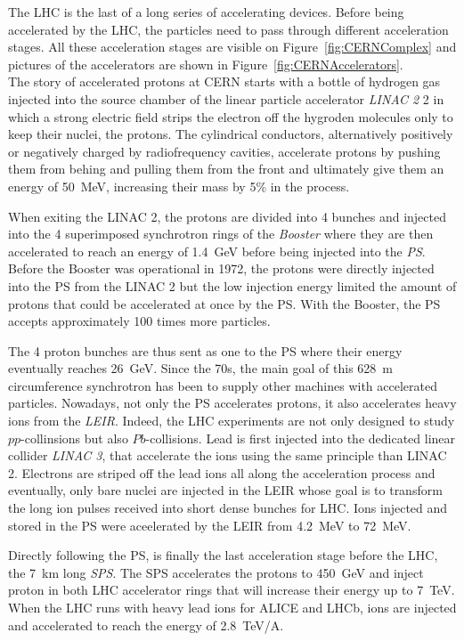 	The LHC is the last of a long series of accelerating devices. Before being accelerated by the LHC, the particles need to pass through different acceleration stages. All these acceleration stages are visible on Figure~\ref{fig:CERNComplex} and pictures of the accelerators are shown in Figure~\ref{fig:CERNAccelerators}.\\
	
	The story of accelerated protons at CERN starts with a bottle of hydrogen gas injected into the source chamber of the linear particle accelerator \textit{LINAC 2} 2 in which a strong electric field strips the electron off the hygroden molecules only to keep their nuclei, the protons. The cylindrical conductors, alternatively positively or negatively charged by radiofrequency cavities, accelerate protons by pushing them from behing and pulling them from the front and ultimately give them an energy of \SI{50}{MeV}, increasing their mass by 5\% in the process.
	
	When exiting the LINAC 2, the protons are divided into 4 bunches and injected into the 4 superimposed synchrotron rings of the \textit{Booster} where they are then accelerated to reach an energy of \SI{1.4}{GeV} before being injected into the \textit{PS}. Before the Booster was operational in 1972, the protons were directly injected into the PS from the LINAC 2 but the low injection energy limited the amount of protons that could be accelerated at once by the PS. With the Booster, the PS accepts approximately 100 times more particles.
	
	The 4 proton bunches are thus sent as one to the PS where their energy eventually reaches \SI{26}{GeV}. Since the 70s, the main goal of this \SI{628}{m} circumference synchrotron has been to supply other machines with accelerated particles. Nowadays, not only the PS accelerates protons, it also accelerates heavy ions from the \textit{\acf{LEIR}}. Indeed, the LHC experiments are not only designed to study $pp$-collinsions but also $Pb$-collisions. Lead is first injected into the dedicated linear collider \textit{LINAC 3}, that accelerate the ions using the same principle than LINAC 2. Electrons are striped off the lead ions all along the acceleration process and eventually, only bare nuclei are injected in the LEIR whose goal is to transform the long ion pulses received into short dense bunches for LHC. Ions injected and stored in the PS were aceelerated by the LEIR from \SI{4.2}{MeV} to \SI{72}{MeV}.
	
	Directly following the PS, is finally the last acceleration stage before the LHC, the \SI{7}{km} long \textit{SPS}. The SPS accelerates the protons to \SI{450}{GeV} and inject proton in both LHC accelerator rings that will increase their energy up to \SI{7}{TeV}. When the LHC runs with heavy lead ions for ALICE and LHCb, ions are injected and accelerated to reach the energy of \SI{2.8}{TeV/A}.
	
